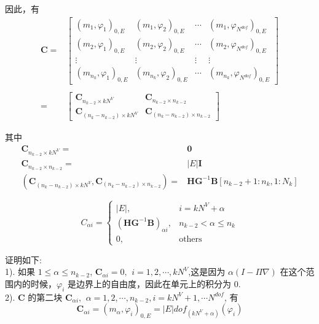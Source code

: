 因此，有 \\
\begin{equation*}
\begin{aligned}
\mathbf C = & \begin{bmatrix}
(m_1, \varphi_1)_{0,E} & (m_1, \varphi_2)_{0,E} & \cdots & (m_1, \varphi_{N^{dof}})_{0,E} \\
(m_2, \varphi_1)_{0,E} & (m_2, \varphi_2)_{0,E} & \cdots & (m_2, \varphi_{N^{dof}})_{0,E}\\
\vdots & \vdots & \vdots & \vdots \\
(m_{n_k}, \varphi_1)_{0,E} & (m_{n_k}, \varphi_2)_{0,E} & \cdots & (m_{n_k}, \varphi_{N^{dof}})_{0,E}
\end{bmatrix} \\
\\
= & \begin{bmatrix}
\mathbf C_{n_{k-2}\times kN^V} & \mathbf C_{n_{k-2}\times n_{k-2}}\\
\mathbf C_{(n_{k} - n_{k-2})\times kN^V} & \mathbf C_{(n_{k} - n_{k-2})\times n_{k-2}}
\end{bmatrix}
\end{aligned}
\end{equation*}

其中 \\
\begin{equation*}
\begin{aligned}
\mathbf C_{n_{k-2}\times kN^V} = & \mathbf 0 \\
\mathbf C_{n_{k-2}\times n_{k-2}} = &|E| \mathbf I\\
(\mathbf C_{(n_{k} - n_{k-2})\times kN^V}, \mathbf C_{(n_{k} - n_{k-2})\times n_{k-2}}) = & \mathbf H\mathbf G^{-1}\mathbf B[n_{k-2}+1:n_k,1:N_k]
\end{aligned}
\end{equation*}

\begin{equation*}
C_{\alpha i} = 
\begin{cases}
|E|, &i = kN^V+\alpha\\
(\mathbf H\mathbf G^{-1}\mathbf B)_{\alpha i}, &n_{k-2} < \alpha \leq n_k\\
0, & \text{others}
\end{cases}
\end{equation*}

证明如下: \\
1). 如果 $1 \le \alpha \le n_{k - 2}$, $\mathbf{C}_{\alpha i} = 0,\,\ i = 1,2,\cdots,kN^V$,这是因为 $\alpha(I−Π∇)$ 在这个范围内的时候，$\varphi_i$ 是边界上的自由度，因此在单元上的积分为 $0$. \\
2). $\mathbf{C}$ 的第二块 $\mathbf{C}_{\alpha i},\,\ \alpha = 1,2,\cdots,n_{k - 2}, i = kN^V +1,\cdots N^{dof}$, 有 \\ 
\begin{equation*}
\mathbf{C}_{\alpha i} = (m_\alpha,\varphi_i)_{0,E} = |E|dof_(kN^V + \alpha)(\varphi_i)
\end{equation*}

